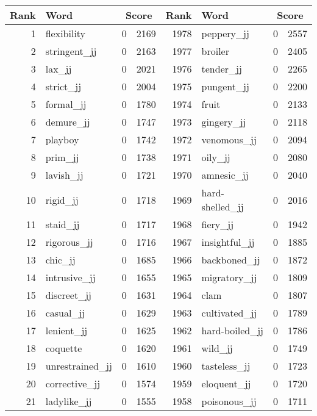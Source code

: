 \begin{table}[tbp]
    \begin{tabular}{| rlr@{.}l | rlr@{.}l |}
    \hline
    \textbf{Rank} & \textbf{Word} & \multicolumn{2}{c|}{\textbf{Score}} & \textbf{Rank} & \textbf{Word} & \multicolumn{2}{c|}{\textbf{Score}} \\
    \hline
    1 & flexibility & 0 & 2169    &    1978 & peppery\_jj & 0 & 2557 \\
    2 & stringent\_jj & 0 & 2163    &    1977 & broiler & 0 & 2405 \\
    3 & lax\_jj & 0 & 2021    &    1976 & tender\_jj & 0 & 2265 \\
    4 & strict\_jj & 0 & 2004    &    1975 & pungent\_jj & 0 & 2200 \\
    5 & formal\_jj & 0 & 1780    &    1974 & fruit & 0 & 2133 \\
    6 & demure\_jj & 0 & 1747    &    1973 & gingery\_jj & 0 & 2118 \\
    7 & playboy & 0 & 1742    &    1972 & venomous\_jj & 0 & 2094 \\
    8 & prim\_jj & 0 & 1738    &    1971 & oily\_jj & 0 & 2080 \\
    9 & lavish\_jj & 0 & 1721    &    1970 & amnesic\_jj & 0 & 2040 \\
    10 & rigid\_jj & 0 & 1718    &    1969 & hard-shelled\_jj & 0 & 2016 \\
    11 & staid\_jj & 0 & 1717    &    1968 & fiery\_jj & 0 & 1942 \\
    12 & rigorous\_jj & 0 & 1716    &    1967 & insightful\_jj & 0 & 1885 \\
    13 & chic\_jj & 0 & 1685    &    1966 & backboned\_jj & 0 & 1872 \\
    14 & intrusive\_jj & 0 & 1655    &    1965 & migratory\_jj & 0 & 1809 \\
    15 & discreet\_jj & 0 & 1631    &    1964 & clam & 0 & 1807 \\
    16 & casual\_jj & 0 & 1629    &    1963 & cultivated\_jj & 0 & 1789 \\
    17 & lenient\_jj & 0 & 1625    &    1962 & hard-boiled\_jj & 0 & 1786 \\
    18 & coquette & 0 & 1620    &    1961 & wild\_jj & 0 & 1749 \\
    19 & unrestrained\_jj & 0 & 1610    &    1960 & tasteless\_jj & 0 & 1723 \\
    20 & corrective\_jj & 0 & 1574    &    1959 & eloquent\_jj & 0 & 1720 \\
    21 & ladylike\_jj & 0 & 1555    &    1958 & poisonous\_jj & 0 & 1711 \\

\end{tabular}
\end{table}
